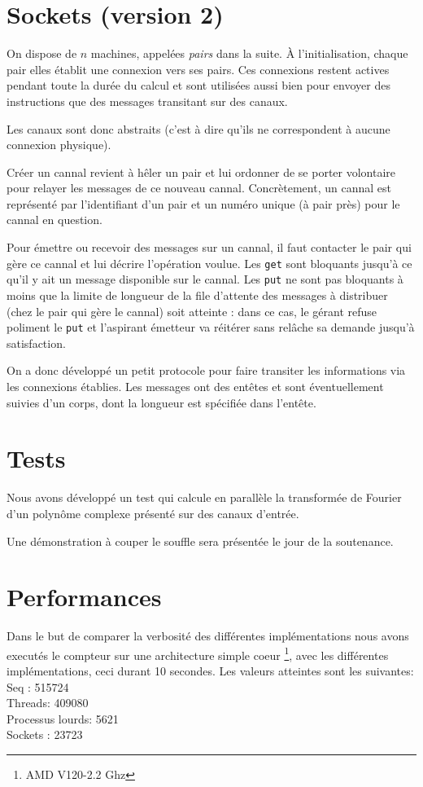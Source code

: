 \documentclass[a4paper]{article}
\begin{document}
\section{Sockets (version 2)}

On dispose de $n$ machines, appelées \emph{pairs} dans la suite.
À l'initialisation, chaque pair elles établit une connexion vers ses pairs.
Ces connexions restent actives pendant toute la durée du calcul et sont utilisées aussi bien pour envoyer des instructions
que des messages transitant sur des canaux.

Les canaux sont donc abstraits (c'est à dire qu'ils ne correspondent à aucune connexion physique).

Créer un cannal revient à hêler un pair et lui ordonner de se porter volontaire pour relayer les
messages de ce nouveau cannal. Concrètement, un cannal est représenté par l'identifiant d'un pair et
un numéro unique (à pair près) pour le cannal en question.

Pour émettre ou recevoir des messages sur un cannal, il faut contacter le pair qui gère ce cannal et
lui décrire l'opération voulue. Les \texttt{get} sont bloquants jusqu'à ce qu'il y ait un message disponible
sur le cannal. Les \texttt{put} ne sont pas bloquants à moins que la limite de longueur de la file d'attente
des messages à distribuer (chez le pair qui gère le cannal) soit atteinte : dans ce cas, le gérant refuse
poliment le \texttt{put} et l'aspirant émetteur va réitérer sans relâche sa demande jusqu'à satisfaction.

On a donc développé un petit protocole pour faire transiter les informations via les connexions établies.
Les messages ont des entêtes et sont éventuellement suivies d'un corps, dont la longueur est spécifiée dans l'entête.

\section{Tests}

Nous avons développé un test qui calcule en parallèle la transformée de Fourier d'un polynôme complexe présenté sur des canaux
d'entrée.

Une démonstration à couper le souffle sera présentée le jour de la soutenance.

\section{Performances}

Dans le but de comparer la verbosité des différentes implémentations
nous avons executés le compteur sur une architecture simple coeur
\footnote{AMD V120-2.2 Ghz}, avec
les différentes implémentations, ceci durant 10 secondes.
Les valeurs atteintes sont les suivantes: \\
Seq : 515724\\
Threads: 409080\\
Processus lourds: 5621\\
Sockets : 23723\\


 
\end{document}
